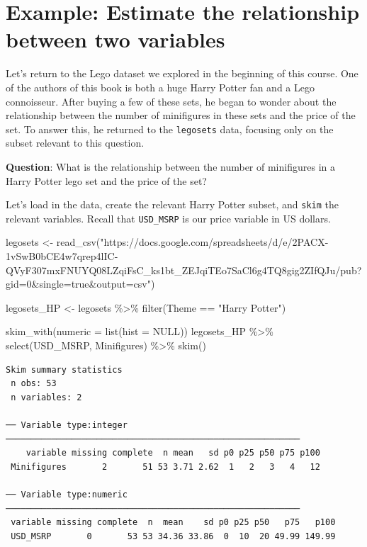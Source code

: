 \documentclass[
  letterpaper,
  DIV=11,
  numbers=noendperiod]{scrreprt}
\newenvironment{Shaded}{\begin{snugshade}}{\end{snugshade}}
\newcommand{\AttributeTok}[1]{\textcolor[rgb]{0.40,0.45,0.13}{#1}}
\newcommand{\ConstantTok}[1]{\textcolor[rgb]{0.56,0.35,0.01}{#1}}
\newcommand{\FunctionTok}[1]{\textcolor[rgb]{0.28,0.35,0.67}{#1}}
\newcommand{\NormalTok}[1]{\textcolor[rgb]{0.00,0.23,0.31}{#1}}
\newcommand{\OtherTok}[1]{\textcolor[rgb]{0.00,0.23,0.31}{#1}}
\newcommand{\SpecialCharTok}[1]{\textcolor[rgb]{0.37,0.37,0.37}{#1}}
\newcommand{\StringTok}[1]{\textcolor[rgb]{0.13,0.47,0.30}{#1}}
\theoremstyle{definition}
\theoremstyle{remark}
\begin{document}
\hypertarget{example-estimate-the-relationship-between-two-variables}{%
\section{Example: Estimate the relationship between two
variables}\label{example-estimate-the-relationship-between-two-variables}}

Let's return to the Lego dataset we explored in the beginning of this
course. One of the authors of this book is both a huge Harry Potter fan
and a Lego connoisseur. After buying a few of these sets, he began to
wonder about the relationship between the number of minifigures in these
sets and the price of the set. To answer this, he returned to the
\texttt{legosets} data, focusing only on the subset relevant to this
question.

\textbf{Question}: What is the relationship between the number of
minifigures in a Harry Potter lego set and the price of the set?

Let's load in the data, create the relevant Harry Potter subset, and
\texttt{skim} the relevant variables. Recall that \texttt{USD\_MSRP} is
our price variable in US dollars.

\begin{Shaded}
\begin{Highlighting}[]
\NormalTok{legosets }\OtherTok{\textless{}{-}} \FunctionTok{read\_csv}\NormalTok{(}\StringTok{"https://docs.google.com/spreadsheets/d/e/2PACX{-}1vSwB0bCE4w7qrep4lIC{-}QVyF307mxFNUYQ08LZqiFsC\_ks1bt\_ZEJqiTEo7SaCl6g4TQ8gig2ZIfQJu/pub?gid=0\&single=true\&output=csv"}\NormalTok{)}

\NormalTok{legosets\_HP }\OtherTok{\textless{}{-}}\NormalTok{ legosets }\SpecialCharTok{\%\textgreater{}\%} 
  \FunctionTok{filter}\NormalTok{(Theme }\SpecialCharTok{==} \StringTok{"Harry Potter"}\NormalTok{)}

\FunctionTok{skim\_with}\NormalTok{(}\AttributeTok{numeric =} \FunctionTok{list}\NormalTok{(}\AttributeTok{hist =} \ConstantTok{NULL}\NormalTok{))}
\NormalTok{legosets\_HP }\SpecialCharTok{\%\textgreater{}\%} 
  \FunctionTok{select}\NormalTok{(USD\_MSRP, Minifigures) }\SpecialCharTok{\%\textgreater{}\%} 
  \FunctionTok{skim}\NormalTok{()}
\end{Highlighting}
\end{Shaded}

\begin{verbatim}
Skim summary statistics
 n obs: 53 
 n variables: 2 

── Variable type:integer ──────────────────────────────────────────────────────────
    variable missing complete  n mean   sd p0 p25 p50 p75 p100
 Minifigures       2       51 53 3.71 2.62  1   2   3   4   12 

── Variable type:numeric ──────────────────────────────────────────────────────────
 variable missing complete  n  mean    sd p0 p25 p50   p75   p100
 USD_MSRP       0       53 53 34.36 33.86  0  10  20 49.99 149.99
\end{verbatim}
\end{document}
